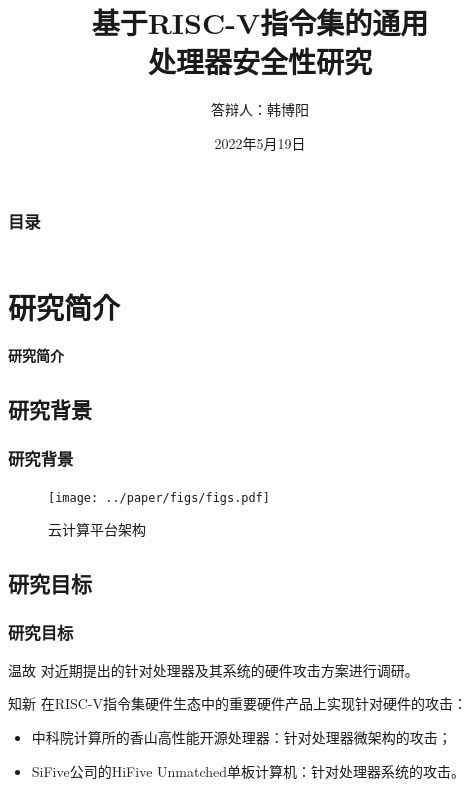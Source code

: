 \documentclass[presentation,aspectratio=169]{beamer}
\title[基于RISC-V指令集的通用处理器安全性研究]{基于RISC-V指令集的通用\\处理器安全性研究}
\author[韩博阳]{答辩人：韩博阳} %
\institute[XMU]{指导老师：周剑扬}%
\date{2022年5月19日} %
\begin{document}
\begin{frame}
\titlepage %
\end{frame}

\begin{frame}
\frametitle{目录} %
    \begin{columns}[T]

        \begin{column}{.45\textwidth}
                \centering
                \tableofcontents[sections={1-2}]
        \end{column}
        \begin{column}{.45\textwidth}
                \centering
            \tableofcontents[sections={3-4}]
        \end{column}
    \end{columns}
\end{frame}



\section{研究简介}

\begin{frame}{}
    \centering
        \Huge\bfseries
    \textcolor{xmucolor}{研究简介}\\
\end{frame}

\subsection{研究背景}
\begin{frame}
\frametitle{研究背景}
\begin{figure}[ht]
    \centering
    \texttt{[image: ../paper/figs/figs.pdf]}
    \caption{云计算平台架构}
\end{figure}
\end{frame}

\subsection{研究目标}
\begin{frame}
\frametitle{研究目标}
\begin{block}{温故}
    对近期提出的针对处理器及其系统的硬件攻击方案进行调研。
\end{block}
\begin{block}{知新}
    在RISC-V指令集硬件生态中的重要硬件产品上实现针对硬件的攻击：
    \begin{itemize}
        \item 中科院计算所的香山高性能开源处理器：针对处理器微架构的攻击；
        \item SiFive公司的HiFive Unmatched单板计算机：针对处理器系统的攻击。
    \end{itemize}
\end{block}
\end{frame}
\end{document}
